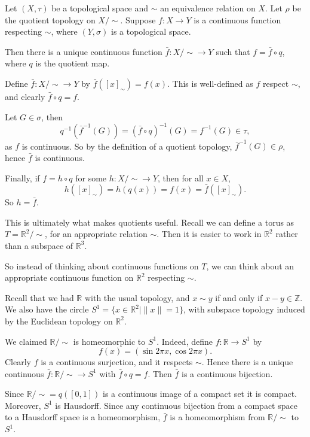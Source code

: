 \documentclass[12pt]{article}
\begin{document}
\begin{proposition}
	Let $(X, \tau)$ be a topological space and $\sim$ an equivalence relation on $X$. Let $\rho$ be the quotient topology on $X/\sim$. Suppose $f : X \to Y$ is a continuous function respecting $\sim$, where $(Y, \sigma)$ is a topological space.

	Then there is a unique continuous function $\bar f : X/\sim \to Y$ such that $f = \bar f \circ q$, where $q$ is the quotient map.
\end{proposition}

\begin{proofbox}
	Define $\bar f : X/\sim \to Y$ by $\bar f([x]_{\sim}) = f(x)$. This is well-defined as $f$ respect $\sim$, and clearly $\bar f \circ q = f$.

	Let $G \in \sigma$, then
	\[
		q^{-1}(\bar f^{-1}(G)) = (\bar f \circ q)^{-1}(G) = f^{-1}(G) \in \tau
	,\]
	as $f$ is continuous. So by the definition of a quotient topology, $\bar f^{-1}(G) \in \rho$, hence $\bar f$ is continuous.

	Finally, if $f = h \circ q$ for some $h : X / \sim \to Y$, then for all $x \in X$,
	\[
		h([x]_{\sim}) = h(q(x)) = f(x) = \bar f([x]_{\sim})
	.\]
	So $h = \bar f$.
\end{proofbox}

\begin{remark}
	This is ultimately what makes quotients useful. Recall we can define a torus as $T = \mathbb{R}^2/\sim$, for an appropriate relation $\sim$. Then it is easier to work in $\mathbb{R}^2$ rather than a subspace of $\mathbb{R}^3$.

	So instead of thinking about continuous functions on $T$, we can think about an appropriate continuous function on $\mathbb{R}^2$ respecting $\sim$.
\end{remark}

\begin{exbox}
	Recall that we had $\mathbb{R}$ with the usual topology, and $x \sim y$ if and only if $x - y \in \mathbb{Z}$. We also have the circle $S^{1} = \{x \in \mathbb{R}^2 \mid \|x\| = 1\}$, with subspace topology induced by the Euclidean topology on $\mathbb{R}^2$.

	We claimed $\mathbb{R}/\sim$ is homeomorphic to $S^{1}$. Indeed, define $f : \mathbb{R} \to S^{1}$ by
	\[
		f(x) = (\sin 2 \pi x, \cos 2 \pi x)
	.\]
	Clearly $f$ is a continuous surjection, and it respects $\sim$. Hence there is a unique continuous $\bar f : \mathbb{R} / \sim \to S^{1}$ with $\bar f \circ q = f$. Then $\bar f$ is a continuous bijection.

	Since $\mathbb{R}/ \sim = q([0, 1])$ is a continuous image of a compact set it is compact. Moreover, $S^{1}$ is Hausdorff. Since any continuous bijection from a compact space to a Hausdorff space is a homeomorphism, $\bar f$ is a homeomorphism from $\mathbb{R}/\sim$ to $S^{1}$.
\end{exbox}
\end{document}
